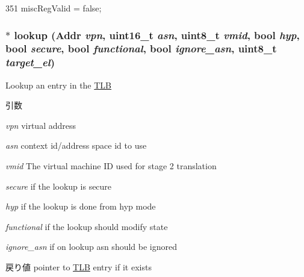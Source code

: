 \begin{DoxyCode}
351 { miscRegValid = false; }
\end{DoxyCode}
\hypertarget{classArmISA_1_1TLB_a16c4d359f56a027d2e6afe6af85c81e4}{
\subsubsection[{lookup}]{ $\ast$ lookup ({\bf Addr} {\em vpn}, \/  uint16\_\-t {\em asn}, \/  uint8\_\-t {\em vmid}, \/  bool {\em hyp}, \/  bool {\em secure}, \/  bool {\em functional}, \/  bool {\em ignore\_\-asn}, \/  uint8\_\-t {\em target\_\-el})}}
\label{classArmISA_1_1TLB_a16c4d359f56a027d2e6afe6af85c81e4}
Lookup an entry in the \hyperlink{classArmISA_1_1TLB}{TLB} 
\begin{DoxyParams}{引数}
\item[{\em vpn}]virtual address \item[{\em asn}]context id/address space id to use \item[{\em vmid}]The virtual machine ID used for stage 2 translation \item[{\em secure}]if the lookup is secure \item[{\em hyp}]if the lookup is done from hyp mode \item[{\em functional}]if the lookup should modify state \item[{\em ignore\_\-asn}]if on lookup asn should be ignored \end{DoxyParams}
\begin{DoxyReturn}{戻り値}
pointer to \hyperlink{classArmISA_1_1TLB}{TLB} entry if it exists 
\end{DoxyReturn}



